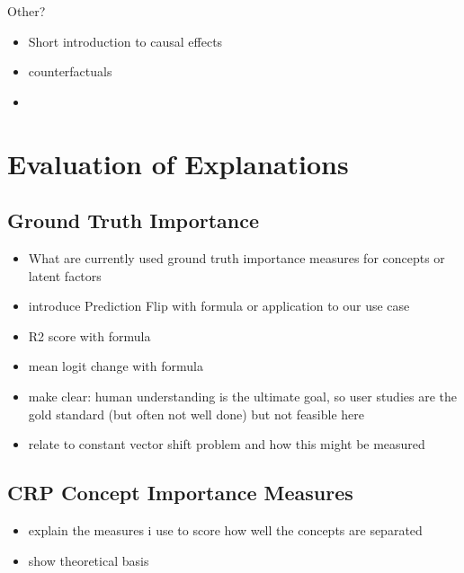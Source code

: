 Other?

\begin{itemize}
    \item Short introduction to causal effects    \item counterfactuals
    \item
\end{itemize}


\section{Evaluation of Explanations}
\subsection{Ground Truth Importance}
\begin{itemize}
    \item What are currently used ground truth importance measures for concepts or latent factors
    \item introduce Prediction Flip with formula or application to our use case
    \item R2 score with formula \cite{Sixt2020}
    \item mean logit change with formula
    \item make clear: human understanding is the ultimate goal, so user studies are the gold standard (but often not well done) but not feasible here
    \item relate to constant vector shift problem and how this might be measured
\end{itemize}
\subsection{CRP Concept Importance Measures}
\begin{itemize}
    \item explain the measures i use to score how well the concepts are separated
    \item show theoretical basis
\end{itemize}

